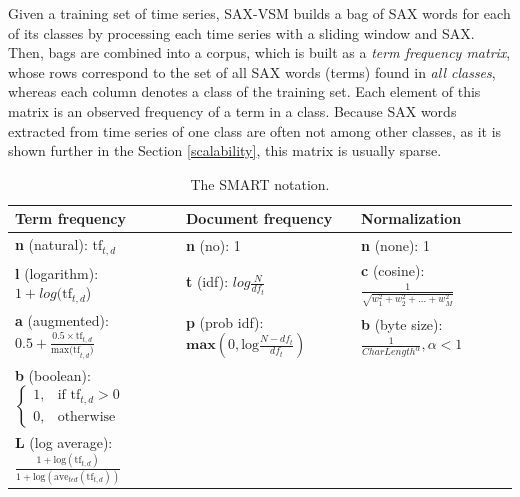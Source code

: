 Given a training set of time series, SAX-VSM builds a bag of SAX words for each of its classes by processing 
each time series with a sliding window and SAX. Then, bags are combined into a corpus, which is built as a 
\textit{term frequency matrix}, whose rows correspond to the set of all SAX words (terms) 
found in \textit{all classes}, whereas each column denotes a class of the training set. 
Each element of this matrix is an observed frequency of a term in a class. 
Because SAX words extracted from time series of one class are often not among other classes, 
as it is shown further in the Section \ref{scalability}, this matrix is usually sparse. 

\begin{table}
\caption{The SMART notation. }
\vspace{0.4cm}
\label{tbl:smart}
{\footnotesize
\begin{tabularx}{\textwidth}{l l l}
\toprule[1pt]
\textbf{Term frequency} &\textbf{Document frequency} &\textbf{Normalization} \\[0.5ex]
\midrule
\textbf{n} (natural):  $\text{tf}_{t,d}$ & \textbf{n} (no): 1 & \textbf{n} (none): 1 \\[2ex]
\textbf{l} (logarithm): $1+log(\text{tf}_{t,d}$) & \textbf{t} (idf): $log\tfrac{N}{df_{t}}$ & \textbf{c} (cosine): $\tfrac{1}{\sqrt{w_1^2 + w_2^2 + ... + w_M^2}}$ \\[2ex]
\textbf{a} (augmented): $0.5 + \tfrac{0.5 \times \text{tf}_{t,d}}{\text{max(tf}_{t,d})}$ & \textbf{p} (prob idf): $\textbf{max}\left( 0,\text{log}\tfrac{N-df_{t}}{df_{t}} \right) $ & 
\textbf{b} (byte size): $\tfrac{1}{CharLength^\alpha}, \alpha < 1 $ \\[2ex]
\textbf{b} (boolean): $\begin{cases} 1, & \text{if tf}_{t,d} > 0 \\ 0, & \text{otherwise} \end{cases} $ & & \\[3ex]
\textbf{L} (log average): $ \tfrac{1+\text{log}(\text{tf}_{t,d})}{1+\text{log}(\text{ave}_{t \epsilon d}( \text{tf}_{t,d}))}$ & & \\[1ex]
\bottomrule[1pt]
\end{tabularx}
}
\end{table}

